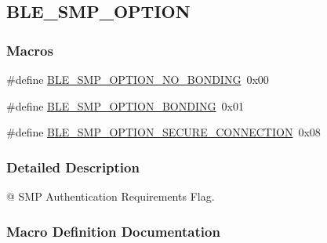 \hypertarget{group___b_l_e___s_m_p___o_p_t_i_o_n}{}\subsection{B\+L\+E\+\_\+\+S\+M\+P\+\_\+\+O\+P\+T\+I\+ON}
\label{group___b_l_e___s_m_p___o_p_t_i_o_n}
\subsubsection*{Macros}
\begin{DoxyCompactItemize}
\item 
\#define \hyperlink{group___b_l_e___s_m_p___o_p_t_i_o_n_ga0d9886fdb9751d986a1b2339bf275216}{B\+L\+E\+\_\+\+S\+M\+P\+\_\+\+O\+P\+T\+I\+O\+N\+\_\+\+N\+O\+\_\+\+B\+O\+N\+D\+I\+NG}~0x00
\item 
\#define \hyperlink{group___b_l_e___s_m_p___o_p_t_i_o_n_ga3667137b0691c33a3c4db428fd12b2a9}{B\+L\+E\+\_\+\+S\+M\+P\+\_\+\+O\+P\+T\+I\+O\+N\+\_\+\+B\+O\+N\+D\+I\+NG}~0x01
\item 
\#define \hyperlink{group___b_l_e___s_m_p___o_p_t_i_o_n_ga77d185d90b9983fea3d46a0422ccb710}{B\+L\+E\+\_\+\+S\+M\+P\+\_\+\+O\+P\+T\+I\+O\+N\+\_\+\+S\+E\+C\+U\+R\+E\+\_\+\+C\+O\+N\+N\+E\+C\+T\+I\+ON}~0x08
\end{DoxyCompactItemize}


\subsubsection{Detailed Description}
@ S\+MP Authentication Requirements Flag. 

\subsubsection{Macro Definition Documentation}
